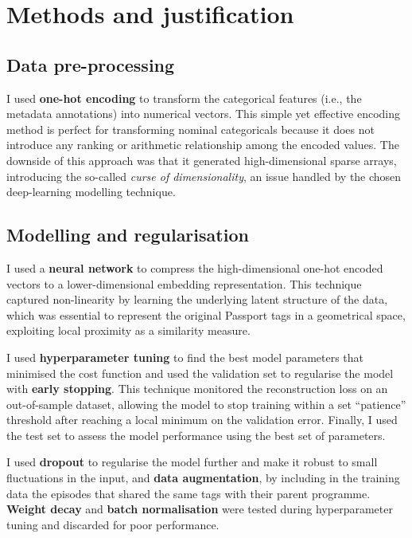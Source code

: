 
\section{Methods and justification}

\subsection{Data pre-processing}

I used \textbf{one-hot encoding} to transform the categorical features (i.e., the metadata annotations) into numerical vectors.
This simple yet effective encoding method is perfect for transforming nominal categoricals because it does not introduce
any ranking or arithmetic relationship among the encoded values.
The downside of this approach was that it generated high-dimensional sparse arrays,
introducing the so-called \textit{curse of dimensionality}, an issue handled by the chosen deep-learning modelling technique.

\subsection{Modelling and regularisation}

I used a \textbf{neural network} to compress the high-dimensional one-hot encoded vectors to a lower-dimensional embedding representation.
This technique captured non-linearity by learning the underlying latent structure of the data,
which was essential to represent the original Passport tags in a geometrical space,
exploiting local proximity as a similarity measure.

I used \textbf{hyperparameter tuning} to find the best model parameters
that minimised the cost function and used the validation set to regularise the model with \textbf{early stopping}.
This technique monitored the reconstruction loss on an out-of-sample dataset,
allowing the model to stop training within a set ``patience'' threshold after reaching a local minimum on the validation error.
Finally, I used the test set to assess the model performance using the best set of parameters.

I used \textbf{dropout} to regularise the model further and make it robust to small fluctuations in the input,
and \textbf{data augmentation}, by including in the training data the episodes that shared the same tags with their parent programme.
\textbf{Weight decay} and \textbf{batch normalisation} were tested during hyperparameter tuning and discarded for poor performance.

